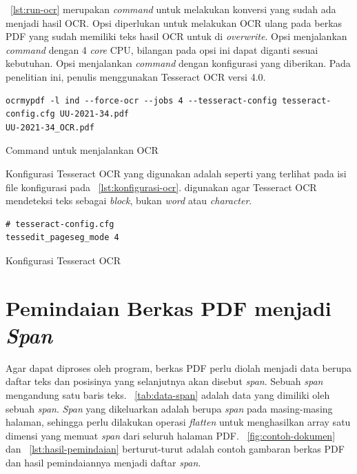 \lst~\ref{lst:run-ocr} merupakan \textit{command} untuk melakukan konversi 
yang sudah ada menjadi  hasil OCR. Opsi  diperlukan
untuk melakukan OCR ulang pada berkas PDF yang sudah memiliki teks hasil OCR untuk di
\textit{overwrite}. Opsi  menjalankan \textit{command} dengan 4 \textit{core} CPU,
bilangan pada opsi ini dapat diganti sesuai kebutuhan. Opsi  menjalankan \textit{command} dengan konfigurasi yang diberikan. Pada
penelitian ini, penulis menggunakan Tesseract OCR versi 4.0.

\begin{listing}[H]
  \begin{verbatim}
ocrmypdf -l ind --force-ocr --jobs 4 --tesseract-config tesseract-config.cfg UU-2021-34.pdf
UU-2021-34_OCR.pdf 
  \end{verbatim}
  \caption{Command untuk menjalankan OCR}
  \label{lst:run-ocr}
\end{listing}

Konfigurasi Tesseract OCR yang digunakan adalah  seperti yang
terlihat pada isi file konfigurasi pada \lst~\ref{lst:konfigurasi-ocr}.  digunakan agar
Tesseract OCR mendeteksi teks sebagai \textit{block}, bukan \textit{word} atau \textit{character}.

\begin{listing}[H]
  \begin{verbatim}
# tesseract-config.cfg
tessedit_pageseg_mode 4
  \end{verbatim}
  \caption{Konfigurasi Tesseract OCR}
  \label{lst:konfigurasi-ocr}
\end{listing}

\section{Pemindaian Berkas PDF menjadi \textit{Span}}
\label{pemindaian-berkas-pdf-menjadi-data-span}

Agar dapat diproses oleh program, berkas PDF perlu diolah menjadi data berupa daftar teks dan
posisinya yang selanjutnya akan disebut \textit{span}. Sebuah \textit{span} mengandung satu baris
teks. \tab~\ref{tab:data-span} adalah data yang dimiliki oleh sebuah \textit{span}. \textit{Span}
yang dikeluarkan adalah berupa \textit{span} pada masing-masing halaman, sehingga perlu dilakukan
operasi \textit{flatten} untuk menghasilkan array satu dimensi yang memuat \textit{span} dari
seluruh halaman PDF. \pic~\ref{fig:contoh-dokumen} dan \lst~\ref{lst:hasil-pemindaian}
berturut-turut adalah contoh gambaran berkas PDF dan hasil pemindaiannya menjadi daftar
\textit{span}.

